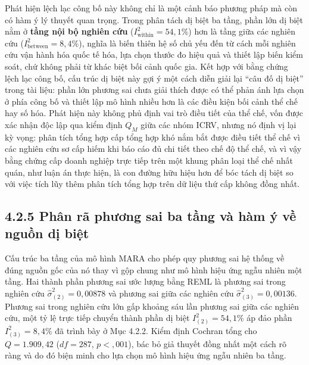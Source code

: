 \documentclass[
  a4paper,
  13pt]{extreport}
\begin{document}
Phát hiện lệch lạc công bố này không chỉ là một cảnh báo phương pháp mà
còn có hàm ý lý thuyết quan trọng. Trong phân tách dị biệt ba tầng, phần
lớn dị biệt nằm ở \textbf{tầng nội bộ nghiên cứu}
(\(I^2_{\text{within}} = 54{,}1\%\)) hơn là tầng giữa các nghiên cứu
(\(I^2_{\text{between}} = 8{,}4\%\)), nghĩa là biến thiên hệ số chủ yếu
đến từ cách mỗi nghiên cứu vận hành hóa quốc tế hóa, lựa chọn thước đo
hiệu quả và thiết lập biến kiểm soát, chứ không phải từ khác biệt bối
cảnh quốc gia. Kết hợp với bằng chứng lệch lạc công bố, cấu trúc dị biệt
này gợi ý một cách diễn giải lại ``câu đố dị biệt'' trong tài liệu: phần
lớn phương sai chưa giải thích được có thể phản ánh lựa chọn ở phía công
bố và thiết lập mô hình nhiều hơn là các điều kiện bối cảnh thể chế hay
số hóa. Phát hiện này không phủ định vai trò điều tiết của thể chế, vốn
được xác nhận độc lập qua kiểm định \(Q_M\) giữa các nhóm ICRV, nhưng nó
định vị lại kỳ vọng: phân tích tổng hợp cấp tổng hợp khó nắm bắt được
điều tiết thể chế vì các nghiên cứu sơ cấp hiếm khi báo cáo đủ chi tiết
theo chế độ thể chế, và vì vậy bằng chứng cấp doanh nghiệp trực tiếp
trên một khung phân loại thể chế nhất quán, như luận án thực hiện, là
con đường hữu hiệu hơn để bóc tách dị biệt so với việc tích lũy thêm
phân tích tổng hợp trên dữ liệu thứ cấp không đồng nhất.

\hypertarget{phuxe2n-ruxe3-phux1b0ux1a1ng-sai-ba-tux1ea7ng-vuxe0-huxe0m-uxfd-vux1ec1-nguux1ed3n-dux1ecb-biux1ec7t}{%
\subsection{4.2.5 Phân rã phương sai ba tầng và hàm ý về nguồn dị
biệt}\label{phuxe2n-ruxe3-phux1b0ux1a1ng-sai-ba-tux1ea7ng-vuxe0-huxe0m-uxfd-vux1ec1-nguux1ed3n-dux1ecb-biux1ec7t}}

Cấu trúc ba tầng của mô hình MARA cho phép quy phương sai hệ thống về
đúng nguồn gốc của nó thay vì gộp chung như mô hình hiệu ứng ngẫu nhiên
một tầng. Hai thành phần phương sai ước lượng bằng REML là phương sai
trong nghiên cứu \(\hat{\sigma}^2_{(2)} = 0{,}00878\) và phương sai giữa
các nghiên cứu \(\hat{\sigma}^2_{(3)} = 0{,}00136\). Phương sai trong
nghiên cứu lớn gấp khoảng sáu lần phương sai giữa các nghiên cứu, một tỷ
lệ trực tiếp chuyển thành phần dị biệt \(I^2_{(2)} = 54{,}1\%\) áp đảo
phần \(I^2_{(3)} = 8{,}4\%\) đã trình bày ở Mục 4.2.2. Kiểm định Cochran
tổng cho \(Q = 1.909{,}42\) (\(df = 287\), \(p < {,}001\)), bác bỏ giả
thuyết đồng nhất một cách rõ ràng và do đó biện minh cho lựa chọn mô
hình hiệu ứng ngẫu nhiên ba tầng.
\end{document}
